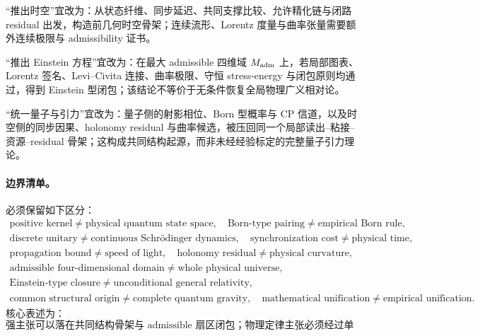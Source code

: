 “推出时空”宜改为：从状态纤维、同步延迟、共同支撑比较、允许精化链与闭路 residual 出发，构造前几何时空骨架；连续流形、Lorentz 度量与曲率张量需要额外连续极限与 admissibility 证书。

“推出 Einstein 方程”宜改为：在最大 admissible 四维域 \(M_{\rm adm}\) 上，若局部图表、Lorentz 签名、Levi--Civita 连接、曲率极限、守恒 stress-energy 与闭包原则均通过，得到 Einstein 型闭包；该结论不等价于无条件恢复全局物理广义相对论。

“统一量子与引力”宜改为：量子侧的射影相位、Born 型概率与 CP 信道，以及时空侧的同步因果、holonomy residual 与曲率候选，被压回同一个局部读出--粘接--资源--residual 骨架；这构成共同结构起源，而非未经经验标定的完整量子引力理论。

\paragraph{边界清单。}
必须保留如下区分：
\[
\boxed{
\begin{gathered}
\text{positive kernel}\ne\text{physical quantum state space},\quad
\text{Born-type pairing}\ne\text{empirical Born rule},\\
\text{discrete unitary}\ne\text{continuous Schr\"odinger dynamics},\quad
\text{synchronization cost}\ne\text{physical time},\\
\text{propagation bound}\ne\text{speed of light},\quad
\text{holonomy residual}\ne\text{physical curvature},\\
\text{admissible four-dimensional domain}\ne\text{whole physical universe},\\
\text{Einstein-type closure}\ne\text{unconditional general relativity},\\
\text{common structural origin}\ne\text{complete quantum gravity},\quad
\text{mathematical unification}\ne\text{empirical unification}.
\end{gathered}
}
\]
核心表述为：
\[
\boxed{
\text{强主张可以落在共同结构骨架与 admissible 扇区闭包；物理定律主张必须经过单位、操作、经验与可证伪证书。}
}
\]
